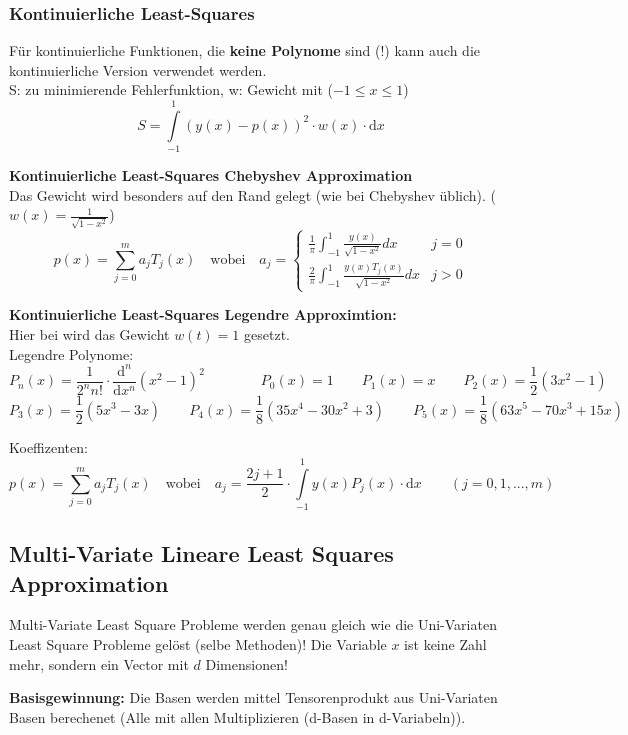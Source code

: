 \subsubsection{Kontinuierliche Least-Squares}
Für kontinuierliche Funktionen, die \textbf{keine Polynome} sind (!) kann auch die kontinuierliche Version
verwendet werden.\\
S: zu minimierende Fehlerfunktion, w: Gewicht mit  ($-1\leq x \leq1$)
\[
	S = \int\limits_{-1}^1 (y(x) - p(x))^2 \cdot w(x) \cdot \mathrm{d}x
\]

\textbf{Kontinuierliche Least-Squares Chebyshev Approximation}\\
 Das Gewicht wird besonders auf den Rand gelegt (wie bei Chebyshev üblich). ($w(x) = \frac{1}{\sqrt{1-x^2}}$)
$$p(x) = \sum_{j=0}^m a_j T_j(x) \quad \text{wobei} \quad
a_j = \begin{cases}
  \frac{1}{\pi} \int_{-1}^1 \frac{y(x)}{\sqrt{1-x^2}} dx & j = 0\\
  \frac{2}{\pi} \int_{-1}^1 \frac{y(x) T_j(x)}{\sqrt{1-x^2}} dx & j > 0 
\end{cases}$$

\textbf{Kontinuierliche Least-Squares Legendre Approximtion:}\\
Hier bei wird das Gewicht $w(t) = 1$ gesetzt.\\

Legendre Polynome:
\[
	P_n(x) = \frac{1}{2^n n!} \cdot \frac{\mathrm{d}^n}{\mathrm{d}x^n}(x^2-1)^2 \qquad \qquad P_0(x) = 1 \qquad P_1(x) = x \qquad P_2(x) = \frac{1}{2}(3x^2-1)
\]
\[
	  P_3(x) = \frac{1}{2}(5x^3 - 3x) \qquad P_4(x) = \frac{1}{8}(35x^4-30x^2+3) \qquad P_5(x) = \frac{1}{8}(63x^5-70x^3+15x)
\]

Koeffizenten:
$$
	p(x) = \sum_{j=0}^m a_j T_j(x) \quad \text{wobei} \quad
	a_j = \frac{2j+1}{2} \cdot \int\limits_{-1}^{1}y(x) P_j(x) \cdot \mathrm{d}x \qquad (j=0,1,...,m)
$$

\subsection{Multi-Variate Lineare Least Squares Approximation}
Multi-Variate Least Square Probleme werden genau gleich wie die Uni-Variaten Least Square Probleme gelöst (selbe Methoden)! Die Variable $x$ ist keine Zahl mehr, sondern ein Vector mit $d$ Dimensionen!

\textbf{Basisgewinnung:}
Die Basen werden mittel Tensorenprodukt aus Uni-Variaten Basen berechenet (Alle mit allen Multiplizieren (d-Basen in d-Variabeln)).

